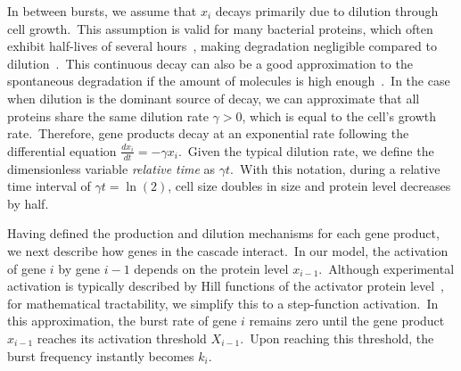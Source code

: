 \documentclass[aps,prb,reprint,superscriptaddress]{revtex4-2}
\begin{document}
In between bursts, we assume that $x_i$ decays primarily due to dilution through cell growth.~This assumption is valid for many bacterial proteins, which often exhibit half-lives of several hours~\cite{Gupta_Johnson_Cruz_Costa_Guest_Li_Hart_Nguyen_Stadlmeier_Bratton_2024}, making degradation negligible compared to dilution~\cite{singh2010stochastic, kannoly2020optimum, Zhang_Zabaikina_Nieto_Vahdat_Bokes_Singh_2025}.~This continuous decay can also be a good approximation to the spontaneous degradation if the amount of molecules is high enough~\cite{gillespie2009deterministic}.~In the case when dilution is the dominant source of decay, we can approximate that all proteins share the same dilution rate $\gamma>0$, which is equal to the cell's growth rate.~Therefore, gene products decay at an exponential rate following the differential equation ${\frac{dx_i}{dt}=-\gamma x_i}$.~Given the typical dilution rate, we define the dimensionless variable \textit{relative time} as $\gamma t$.~With this notation, during a relative time interval of $\gamma t = \ln(2)$, cell size doubles in size and protein level decreases by half.


Having defined the production and dilution mechanisms for each gene product, we next describe how genes in the cascade interact.~In our model, the activation of gene $i$ by gene $i-1$ depends on the protein level $x_{i-1}$.~Although experimental activation is typically described by Hill functions of the activator protein level~\cite{Bintu_Buchler_Garcia_Gerland_Hwa_Kondev_Kuhlman_Phillips_2005, Garcia_Phillips_2011}, for mathematical tractability, we simplify this to a step-function activation.~In this approximation, the burst rate of gene $i$ remains zero until the gene product $x_{i-1}$ reaches its activation threshold $X_{i-1}$.~Upon reaching this threshold, the burst frequency instantly becomes $k_i$.
\end{document}

